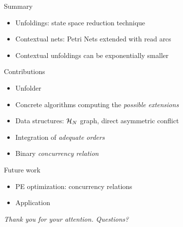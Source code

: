 \documentclass[table,red,11pt]{beamer}
\begin{document}
\begin{frame}{Summary}
\begin{itemize}
\item Unfoldings: state space reduction technique
\item Contextual nets: Petri Nets extended with read arcs
\item Contextual unfoldings can be exponentially smaller
\end{itemize}

\begin{block}{Contributions}
\begin{itemize}
\item Unfolder
\item Concrete algorithms computing the \emph{possible extensions}
\item Data structures: $\mathcal{H}_{N}$ graph, direct asymmetric conflict
\item Integration of \emph{adequate orders}
\item Binary \emph{concurrency relation}
\end{itemize}
\end{block}

\begin{block}{Future work}
\begin{itemize}
\item PE optimization: concurrency relations
\item Application
\end{itemize}
\end{block}

\end{frame}

\begin{frame}
\titlepage
\begin{center}
\textit{Thank you for your attention. Questions?}
\end{center}
\end{frame}

%
%
%
\end{document}
